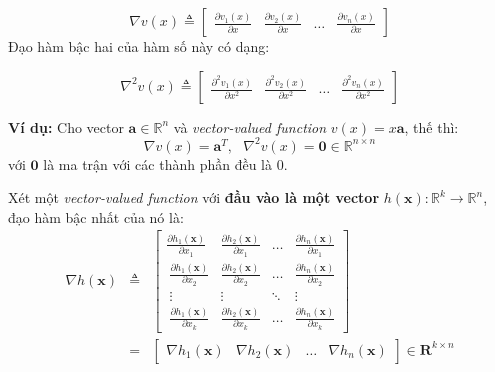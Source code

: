 \documentclass[12pt]{article}
\begin{document}
\begin{equation} 
\label{eqn:grvectorvalued}
\nabla v(x) \triangleq  
\left[ 
\begin{matrix} 
    \frac{\partial v_1(x)}{\partial x} & \frac{\partial v_2(x)}{\partial x} & \dots & \frac{\partial v_n(x)}{\partial x} 
\end{matrix} 
\right]
\end{equation} 
Đạo hàm bậc hai của hàm số này có dạng: 
 
\begin{equation} 
	\label{eqn:hessianvectorvalued}
	\nabla^2 v(x) \triangleq  
	\left[ 
	\begin{matrix} 
	    \frac{\partial^2 v_1(x)}{\partial x^2} & \frac{\partial^2 v_2(x)}{\partial x^2} & \dots & \frac{\partial^2 v_n(x)}{\partial x^2} 
	\end{matrix} 
	\right] 
\end{equation} 
 
\textbf{Ví dụ:} Cho vector $\mathbf{a} \in \mathbb{R}^n$ và \textit{vector-valued function} $v(x) = x\mathbf{a}$, thế thì: 
\begin{equation} 
\nabla v(x) = \mathbf{a}^T, ~~~ \nabla^2 v(x) = \mathbf{0} \in \mathbb{R}^{n\times n} 
\end{equation} 
với $\mathbf{0}$ là ma trận với các thành phần đều là 0.  

Xét một \textit{vector-valued function} với \textbf{đầu vào là một vector} $h(\mathbf{x}):\mathbb{R}^k \rightarrow \mathbb{R}^n$, đạo hàm bậc nhất của nó là: 
\begin{eqnarray} 
\label{eqn:gdvectorvector}
\nabla h(\mathbf{x}) &\triangleq & 
\left[ 
\begin{matrix} 
    \frac{\partial h_1(\mathbf{x})}{\partial x_1} & \frac{\partial h_2(\mathbf{x})}{\partial x_1} & \dots & \frac{\partial h_n(\mathbf{x})}{\partial x_1} \\\  
    \frac{\partial h_1(\mathbf{x})}{\partial x_2} & \frac{\partial h_2(\mathbf{x})}{\partial x_2} & \dots & \frac{\partial h_n(\mathbf{x})}{\partial x_2} \\\  
    \vdots & \vdots & \ddots & \vdots \\\ 
    \frac{\partial h_1(\mathbf{x})}{\partial x_k} & \frac{\partial h_2(\mathbf{x})}{\partial x_k} & \dots & \frac{\partial h_n(\mathbf{x})}{\partial x_k} 
\end{matrix} 
\right]\\
\label{eqn:gdvectorvector_short}
& = &  
\left[ 
\begin{matrix} 
    \nabla h_1(\mathbf{x}) & \nabla h_2(\mathbf{x}) & \dots & \nabla h_n(\mathbf{x}) 
\end{matrix} 
\right] \in \mathbf{R}^{k\times n} 
\end{eqnarray} 
 
\end{document}
